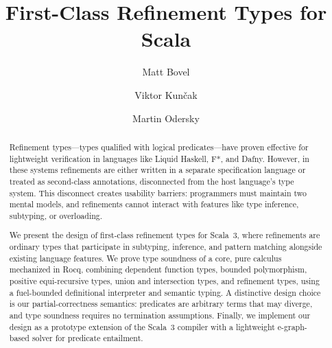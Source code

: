 \documentclass[acmsmall]{acmart}
\begin{document}
\title{First-Class Refinement Types for Scala}

\author{Matt Bovel}
\iflatexml\else\correspondingauthor\fi
{}

\author{Viktor Kunčak}

\author{Martin Odersky}


\begin{abstract}
Refinement types---types qualified with logical predicates---have proven effective for lightweight verification in languages like Liquid Haskell, F*, and Dafny. However, in these systems refinements are either written in a separate specification language or treated as second-class annotations, disconnected from the host language's type system. This disconnect creates usability barriers: programmers must maintain two mental models, and refinements cannot interact with features like type inference, subtyping, or overloading.

We present the design of first-class refinement types for Scala~3, where refinements are ordinary types that participate in subtyping, inference, and pattern matching alongside existing language features. We prove type soundness of a core, pure calculus mechanized in Rocq, combining dependent function types, bounded polymorphism, positive equi-recursive types, union and intersection types, and refinement types, using a fuel-bounded definitional interpreter and semantic typing. A distinctive design choice is our partial-correctness semantics: predicates are arbitrary terms that may diverge, and type soundness requires no termination assumptions. Finally, we implement our design as a prototype extension of the Scala~3 compiler with a lightweight e-graph-based solver for predicate entailment.
\end{abstract}
\end{document}
